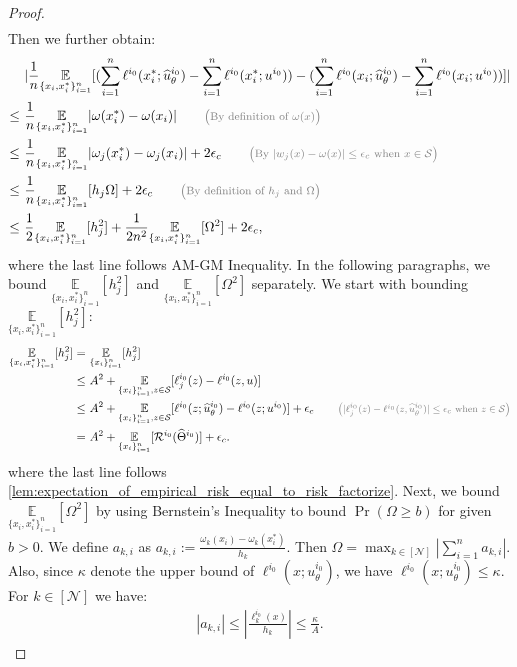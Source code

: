 \documentclass[12pt]{article}
\numberwithin{equation}{section}
\let\hat\widehat
\newcommand{\wh}{\widehat}
\renewcommand{\hat}{\wh}
\DeclareMathOperator*{\E}{{\mathbb{E}}}
\def\E{\mathbb{E}}
\theoremstyle{theoremstyle}
\numberwithin{equation}{section}
\numberwithin{theorem}{section}
\numberwithin{proposition}{section}
\numberwithin{definition}{section}
\numberwithin{lemma}{section}
\numberwithin{assumption}{section}
\numberwithin{remark}{section}
\newcommand*{\annot}[1]{\tag*{\footnotesize{\textcolor{black!50}{\big(#1\big)}}}}
\begin{document}
\begin{proof}
\begin{align*}
\end{align*}
Then we further obtain:
\begin{align}
    & ~|\frac{1}{n}\underset{\{x_i,x_i^*\}_{i=1}^n}{\E}[(\sum_{i=1}^n\ell^{i_0}(x_i^*;\hat{u}^{i_0}_\theta)-\sum_{i=1}^n\ell^{i_0}(x_i^*;u^{i_0}))-(\sum_{i=1}^n\ell^{i_0}(x_i;\hat{u}^{i_0}_\theta)-\sum_{i=1}^n\ell^{i_0}(x_i;u^{i_0}))]| \\
    \leq & ~
    \frac{1}{n}\underset{\{x_i,x_i^*\}_{i=1}^n}{\E}|\omega(x_i^*)-\omega(x_i)| \annot{By definition of $\omega(x)$}\\
    \leq & ~
    \frac{1}{n}\underset{\{x_i,x_i^*\}_{i=1}^n}{\E}|\omega_j(x_i^*)-\omega_j(x_i)|+2\epsilon_c \annot{By $|w_j(x)-\omega(x)|\leq\epsilon_c$ when $x\in \mathcal{S}$}\\
    \leq & ~
    \frac{1}{n}\underset{\{x_i,x_i^*\}_{i=1}^n}{\E}[h_j\Omega]+2\epsilon_c \annot{By definition of $h_j$ and $\Omega$}\\
    \label{eq:decomposition_to_h_and_big_omega}
    \leq & ~
    \frac{1}{2}\underset{\{x_i,x_i^*\}_{i=1}^n}{\E}[h_j^2]+\frac{1}{2n^2}\underset{\{x_i,x_i^*\}_{i=1}^n}{\E}[\Omega^2]+2\epsilon_c,
\end{align}
where the last line follows AM-GM Inequality.
In the following paragraphs, we bound $\underset{\{x_i,x_i^*\}_{i=1}^n}{\E}[h_j^2]$ and $\underset{\{x_i,x_i^*\}_{i=1}^n}{\E}[\Omega^2]$ separately. 
We start with bounding $\underset{\{x_i,x_i^*\}_{i=1}^n}{\E}[h_j^2]$:
\begin{align}
    \underset{\{x_i,x_i^*\}_{i=1}^n}{\E}[h_j^2] = & ~
    \underset{\{x_i\}_{i=1}^n}{\E}[h_j^2] \notag\\
    \leq & ~ 
    A^2+\underset{\{x_i\}_{i=1}^n,z\in \mathcal{S}}{\E}[\ell^{i_0}_j(z)-\ell^{i_0}(z,u)] \notag\\
    \leq & ~
    A^2+\underset{\{x_i\}_{i=1}^n,z\in \mathcal{S}}{\E}[\ell^{i_0}(z;\hat{u}^{i_0}_\theta)-\ell^{i_0}(z;u^{i_0})]+\epsilon_c \annot{$|\ell^{i_0}_j(z)-\ell^{i_0}(z,\hat{u}^{i_0}_\theta)|\leq\epsilon_c$ when $z\in \mathcal{S}$}\\
    \label{eq:estimation_upper_bound_h}
    = & ~
    A^2+\underset{\{x_i\}_{i=1}^n}{\E}[\mathcal{R}^{i_0}(\hat{\Theta}^{i_0})]+\epsilon_c.
\end{align}
where the last line follows \cref{lem:expectation_of_empirical_risk_equal_to_risk_factorize}.
Next, we bound $\underset{\{x_i,x_i^*\}_{i=1}^n}{\E}[\Omega^2]$ by using Bernstein's Inequality to bound $\Pr(\Omega\geq b)$ for given $b>0$.
We define $a_{k,i}$ as $a_{k,i}:=\frac{\omega_k(x_i)-\omega_k(x_i^*)}{h_k}$.
Then $\Omega=\max_{k\in[\mathcal{N}]}|\sum_{i=1}^na_{k,i}|$.
Also,  since $\kappa$ denote the upper bound of $\ell^{i_0}(x;u^{i_0}_\theta)$, we have $\ell^{i_0}(x;u^{i_0}_\theta)\leq \kappa$.
For $k\in[\mathcal{N}]$ we have:
\begin{align}\label{eq:upper_bound_of_ai}
    |a_{k,i}|\leq |\frac{\ell^{i_0}_k(x)}{h_k}|\leq\frac{\kappa}{A}.
\end{align}



\end{proof}
\end{document}
